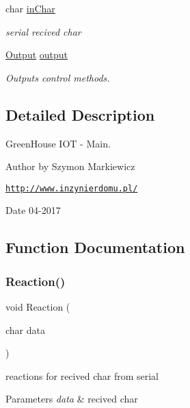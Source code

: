 \begin{DoxyCompactItemize}
\mbox{\label{_arduino_8ino_ae5e1acc5a587e20678d007f4fcc3dbf7}} 
char \hyperlink{_arduino_8ino_ae5e1acc5a587e20678d007f4fcc3dbf7}{in\+Char}
\begin{DoxyCompactList}\small\item\em serial recived char \end{DoxyCompactList}\item 
\mbox{\label{_arduino_8ino_ab5300e2f6946c08a6478743e043a48c0}} 
\hyperlink{class_output}{Output} \hyperlink{_arduino_8ino_ab5300e2f6946c08a6478743e043a48c0}{output}
\begin{DoxyCompactList}\small\item\em Outputs control methods. \end{DoxyCompactList}\end{DoxyCompactItemize}


\subsection{Detailed Description}
Green\+House I\+OT -\/ Main. 

\begin{DoxyAuthor}{Author}
by Szymon Markiewicz
\end{DoxyAuthor}
\href{http://www.inzynierdomu.pl/}{\tt http\+://www.\+inzynierdomu.\+pl/} \begin{DoxyDate}{Date}
04-\/2017 
\end{DoxyDate}


\subsection{Function Documentation}
\mbox{\label{_arduino_8ino_a3640ee72ee61eaba275b032cfce4f023}} 
\subsubsection{\texorpdfstring{Reaction()}{Reaction()}}
{\footnotesize\ttfamily void Reaction (\begin{DoxyParamCaption}\item[{char}]{data }\end{DoxyParamCaption})}



reactions for recived char from serial 


\begin{DoxyParams}{Parameters}
{\em data} & recived char \\
\hline
\end{DoxyParams}
